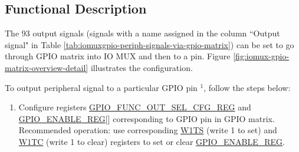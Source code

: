 \documentclass[main\_\_EN.tex]{subfiles}
\begin{document}
\subsection{Functional Description}\label{IOMUXPeripheralOutput}

The 93 output signals (signals with a name assigned in the column ``Output signal" in Table  \ref{tab:iomuxgpio-periph-signals-via-gpio-matrix}) can be set to go through GPIO matrix into IO MUX and then to a pin. Figure  \ref{fig:iomux-gpio-matrix-overview-detail} illustrates the configuration.

To output peripheral signal  to a particular GPIO pin \hyperref[output-note-1]{$^1$}, follow the steps below:

\begin{enumerate}
    \item Configure registers \hyperref[regdesc:GPIOFUNCNOUTSELCFGREG]{GPIO\_FUNC\_OUT\_SEL\_CFG\_REG} and  \hyperref[regdesc:GPIOENABLEREG]{GPIO\_ENABLE\_REG}[] corresponding to GPIO pin  in GPIO matrix. Recommended operation: use corresponding \hyperref[regdesc:GPIOENABLEW1TSREG]{W1TS} (write 1 to set) and \hyperref[regdesc:GPIOENABLEW1TCREG]{W1TC} (write 1 to clear) registers to set or clear \hyperref[regdesc:GPIOENABLEREG]{GPIO\_ENABLE\_REG}. 
    

\end{enumerate}
\end{document}
